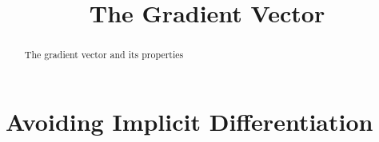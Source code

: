 \documentclass{ximera}
\title{The Gradient Vector}
\begin{document}
\begin{abstract}
The gradient vector and its properties
\end{abstract}
\maketitle


\section{Avoiding Implicit Differentiation}
\end{document}
